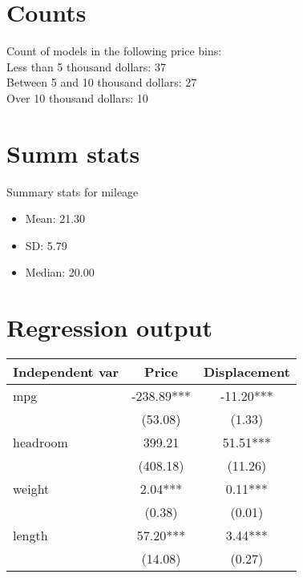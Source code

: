 \documentclass[12pt]{article}
\begin{document}
\section{Counts}
Count of models in the following price bins:\\ 
Less than 5 thousand dollars: 37 \\
Between 5 and 10 thousand dollars: 27 \\
Over 10 thousand dollars: 10 \\

\section{Summ stats}
Summary stats for mileage
\begin{itemize}
\item Mean: 21.30
\item SD: 5.79
\item Median: 20.00
\end{itemize}

\section{Regression output}
\begin{tabular}{lcc}
\hline
 \hline
 Independent var  &  Price & Displacement \\
\hline
mpg & -238.89*** & -11.20***\\
& (53.08) & (1.33)\\
headroom & 399.21 & 51.51***\\
& (408.18) & (11.26)\\
weight & 2.04*** & 0.11***\\
& (0.38) & (0.01)\\
length & 57.20*** & 3.44***\\
& (14.08) & (0.27)\\
\hline
\hline
\end{tabular}
\end{document}
